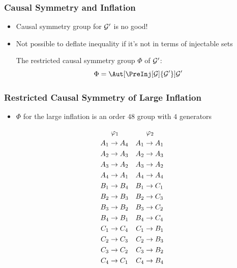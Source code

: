 \documentclass[
    hyperref={bookmarks=false},%
    xcolor={dvipsnames},
]{beamer}
\renewcommand{\term}[1]{\textcolor{Mahogany}{#1}}
\begin{document}
\begin{frame}
    \frametitle{Causal Symmetry and Inflation}
    \begin{itemize}
        \item Causal symmetry group for $\mathcal{G}'$ is no good!
        \item Not possible to deflate inequality if it's not in terms of injectable sets
        \begin{definition}
            The \term{restricted causal symmetry group} $\Phi$ of $\mathcal{G}'$:
            \[ \Phi = \Aut[\PreInj[\graph]{\graph'}]{\graph'} \]
        \end{definition}
    \end{itemize}
\end{frame}

\begin{frame}
    \frametitle{Restricted Causal Symmetry of Large Inflation}
    \begin{itemize}
        \item $\Phi$ for the large inflation is an order $48$ group with $4$ generators
    \end{itemize}
    \begin{equation*}
    \begin{aligned}[c]
    &\hspace{1mm}\gep_1 \\
    A_1 &\to A_4 \\A_2 &\to A_3 \\A_3 &\to A_2 \\A_4 &\to A_1 \\B_1 &\to B_4 \\B_2 &\to B_3 \\B_3 &\to B_2 \\B_4 &\to B_1 \\C_1 &\to C_4 \\C_2 &\to C_3 \\C_3 &\to C_2 \\C_4 &\to C_1
    \end{aligned}
    \quad
    \begin{aligned}[c]
    &\hspace{1mm}\gep_2 \\
    A_1 &\to A_1 \\A_2 &\to A_3 \\A_3 &\to A_2 \\A_4 &\to A_4 \\B_1 &\to C_1 \\B_2 &\to C_3 \\B_3 &\to C_2 \\B_4 &\to C_4 \\C_1 &\to B_1 \\C_2 &\to B_3 \\C_3 &\to B_2 \\C_4 &\to B_4

\end{aligned}
\end{equation*}
\end{frame}
\end{document}
